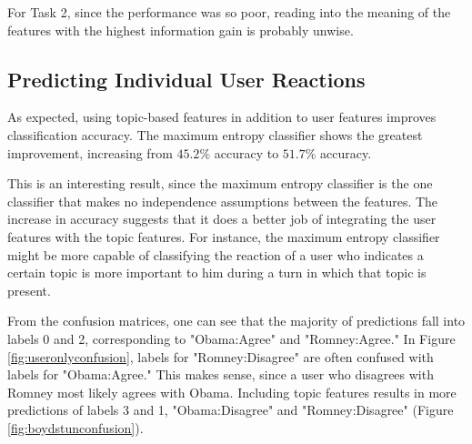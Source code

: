 \documentclass[12pt]{article}
\begin{document}
For Task 2, since the performance was so poor, reading into the meaning of the features with the highest information gain is probably unwise.

\subsection{Predicting Individual User Reactions}

As expected, using topic-based features in addition to user features improves classification accuracy. The maximum entropy classifier shows the greatest improvement, increasing from $45.2\%$ accuracy to $51.7\%$ accuracy.

This is an interesting result, since the maximum entropy classifier is the one classifier that makes no independence assumptions between the features. The increase in accuracy suggests that it does a better job of integrating the user features with the topic features. For instance, the maximum entropy classifier might be more capable of classifying the reaction of a user who indicates a certain topic is more important to him during a turn in which that topic is present.

From the confusion matrices, one can see that the majority of predictions fall into labels 0 and 2, corresponding to "Obama:Agree" and "Romney:Agree." In Figure \ref{fig:useronlyconfusion}, labels for "Romney:Disagree" are often confused with labels for "Obama:Agree." This makes sense, since a user who disagrees with Romney most likely agrees with Obama. Including topic features results in more predictions of labels 3 and 1, "Obama:Disagree" and "Romney:Disagree" (Figure \ref{fig:boydstunconfusion}).
\end{document}
